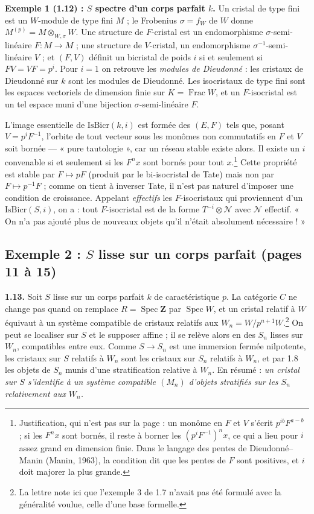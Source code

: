 \documentclass[11pt,a4paper]{article}
\begin{document}
\textbf{Exemple 1 (1.12) : $S$ spectre d'un corps parfait $k$.} Un cristal de
type fini est un $W$-module de type fini $M$ ; le Frobenius $\sigma = f_W$ de
$W$ donne $M^{(p)} = M \otimes_{W,\sigma} W$. Une structure de $F$-cristal
est un endomorphisme $\sigma$-semi-linéaire $F : M \to M$ ; une structure de
$V$-cristal, un endomorphisme $\sigma^{-1}$-semi-linéaire $V$ ; et $(F,V)$
définit un bicristal de poids $i$ si et seulement si $FV = VF = p^i$. Pour
$i = 1$ on retrouve les \emph{modules de Dieudonné} : les cristaux de
Dieudonné sur $k$ sont les modules de Dieudonné. Les isocristaux de type fini
sont les espaces vectoriels de dimension finie sur $K = \operatorname{Frac}W$,
et un $F$-isocristal est un tel espace muni d'une bijection
$\sigma$-semi-linéaire $F$.

L'image essentielle de $\mathrm{IsBicr}(k,i)$ est formée des $(E, F)$ tels
que, posant $V = p^iF^{-1}$, l'orbite de tout vecteur sous les monômes non
commutatifs en $F$ et $V$ soit bornée — « pure tautologie », car un réseau
stable existe alors. Il existe un $i$ convenable si et seulement si les
$F^nx$ sont bornés pour tout $x$.\footnote{Justification, qui n'est pas sur la
page : un monôme en $F$ et $V$ s'écrit $p^{ib}F^{a-b}$ ; si les $F^nx$ sont
bornés, il reste à borner les $(p^iF^{-1})^n x$, ce qui a lieu pour $i$ assez
grand en dimension finie. Dans le langage des pentes de Dieudonné--Manin
(Manin, 1963), la condition dit que les pentes de $F$ sont positives, et $i$
doit majorer la plus grande.} Cette propriété est stable par $F \mapsto pF$
(produit par le bi-isocristal de Tate) mais non par $F \mapsto p^{-1}F$ ; comme
on tient à inverser Tate, il n'est pas naturel d'imposer une condition de
croissance. Appelant \emph{effectifs} les $F$-isocristaux qui proviennent d'un
$\mathrm{IsBicr}(S,i)$, on a : tout $F$-isocristal est de la forme
$T^{-i} \otimes \mathcal{N}$ avec $\mathcal{N}$ effectif. « On n'a pas ajouté
plus de nouveaux objets qu'il n'était absolument nécessaire ! »

\subsection*{Exemple 2 : $S$ lisse sur un corps parfait (pages 11 à 15)}

\textbf{1.13.} Soit $S$ lisse sur un corps parfait $k$ de caractéristique $p$.
La catégorie $C$ ne change pas quand on remplace
$R = \operatorname{Spec}\mathbf{Z}$ par $\operatorname{Spec}W$, et un
cristal relatif à $W$ équivaut à un système compatible de cristaux relatifs aux
$W_n = W/p^{n+1}W$.\footnote{La lettre note ici que l'exemple 3 de 1.7 n'avait
pas été formulé avec la généralité voulue, celle d'une base formelle.} On peut
se localiser sur $S$ et le supposer affine ; il se relève alors en des $S_n$
lisses sur $W_n$, compatibles entre eux. Comme $S \to S_n$ est une immersion
fermée nilpotente, les cristaux sur $S$ relatifs à $W_n$ sont les cristaux sur
$S_n$ relatifs à $W_n$, et par 1.8 les objets de $S_n$ munis d'une
stratification relative à $W_n$. En résumé : \emph{un cristal sur $S$
s'identifie à un système compatible $(M_n)$ d'objets stratifiés sur les $S_n$
relativement aux $W_n$.}
\end{document}
